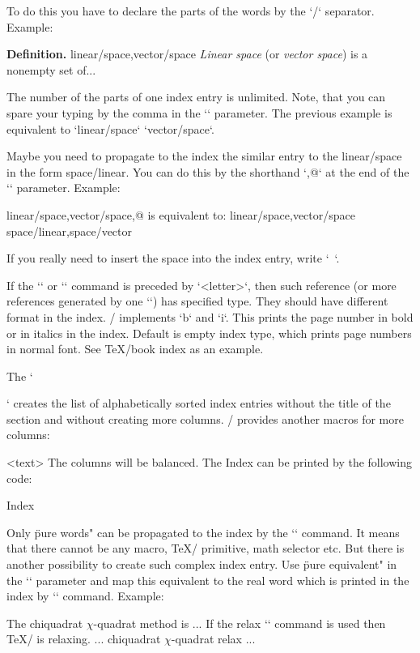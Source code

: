 {\medskip

To do this you have to declare the parts of the words by the `/` separator.
Example:

\begtt
{\bf Definition.}
\ii linear/space,vector/space
{\em Linear space} (or {\em vector space}) is a nonempty set of...
\endtt

The number of the parts of one index entry is unlimited. Note, that you can
spare your typing by the comma in the `\ii` parameter. The previous example
is equivalent to `\ii linear/space` `\ii vector/space`.

Maybe you need to propagate to the index the similar entry to the
linear/space in the form space/linear. You can do this by the shorthand `,@`
at the end of the `\ii` parameter. Example:

\begtt
\ii linear/space,vector/space,@
is equivalent to:
\ii linear/space,vector/space \ii space/linear,space/vector
\endtt

If you really need to insert the space into the index entry, write `~`.

If the `\ii` or `\iid` command is preceded by `\iitype <letter>`, then such
reference (or more references generated by one `\ii`) has specified type.
They should have different format in the index. \OpTeX/ implements 
`\iitype b` and `\iitype i`. This prints the page number in bold or in
italics in the index. Default is empty index type, which prints page numbers
in normal font. See \TeX/book index as an example.

The `\makeindex` creates the list of alphabetically sorted index entries
without the title of the section and without creating more columns. \OpTeX/
provides another macros for more columns: 

\begtt
{}
<text>
\endmulti
\endtt
The columns will be balanced. The Index can be printed by the following
code:

\begtt
\sec Index
 \makeindex \endmulti
\endtt

Only \"pure words" can be propagated to the index by the `\ii` command. It
means that there cannot be any macro, \TeX/ primitive, math selector etc.
But there is another possibility to create such complex index entry. Use
\"pure equivalent" in the `\ii` parameter and map this equivalent to the
real word which is printed in the index by `\iis` command. Example:

\begtt
The \ii chiquadrat $\chi$-quadrat method is 
...
If the \ii relax `\relax` command is used then \TeX/ is relaxing.
...
\iis chiquadrat {$\chi$-quadrat}
\iis relax {\code{\\relax}}
...
\endtt

}
